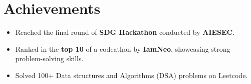 \documentclass[a4paper,11pt]{article}
\begin{document}
\section*{Achievements}
\begin{itemize}[leftmargin=*, itemsep=0pt, parsep=0pt]
    \item Reached the final round of \textbf{SDG Hackathon} conducted by \textbf{AIESEC}.
    \item Ranked in the \textbf{top 10} of a codeathon by \textbf{IamNeo}, showcasing strong problem-solving skills.
     \item  Solved 100+ Data structures and Algorithms (DSA) problems on Leetcode.
\end{itemize}




\end{document}
